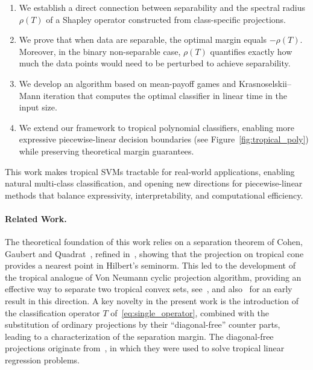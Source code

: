 \documentclass{article}
\begin{document}
\begin{enumerate}
    \item We establish a direct connection between separability and the spectral radius $\rho(T)$ of a Shapley operator constructed from class-specific projections.
    
    \item We prove that when data are separable, the optimal margin equals $-\rho(T)$. Moreover, in the binary non-separable case, $\rho(T)$ quantifies exactly how much the data points would need to be perturbed to achieve separability.
    
    \item We develop an algorithm based on mean-payoff games and Krasnoselskii--Mann iteration that computes the optimal classifier in linear time in the input size.
    
    \item We extend our framework to tropical polynomial classifiers, enabling more expressive piecewise-linear decision boundaries (see Figure~\ref{fig:tropical_poly}) while preserving theoretical margin guarantees.
\end{enumerate}

This work makes tropical SVMs tractable for real-world applications, enabling natural multi-class classification, and opening new directions for piecewise-linear methods that balance expressivity, interpretability, and computational efficiency.

\paragraph{Related Work.}
The theoretical foundation of this work relies on a separation theorem of Cohen, Gaubert and Quadrat~\cite{cohen2004}, refined in~\cite{AGNS10},  showing that the projection on tropical cone provides a nearest point in Hilbert's seminorm. This led to the development of the tropical
analogue of Von Neumann cyclic projection algorithm, providing an effective
way to separate two tropical convex sets, see~\cite{gaubert2011}, and also~\cite{CuninghameGreen2003} for an early result
in this direction. A key novelty in the present work is the introduction
of the classification operator $T$ of~\eqref{eq:single_operator}, combined
with the substitution of ordinary projections by their ``diagonal-free'' counter parts,
leading to a characterization of the separation margin. The diagonal-free projections
originate from~\cite{akiangaubertqisaadi},
in which they were used to solve tropical linear regression
problems.
\end{document}

